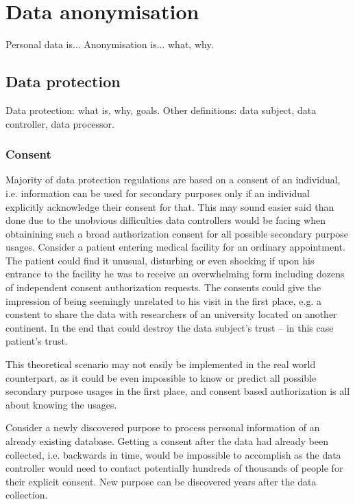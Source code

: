 \documentclass[a4paper,twoside,12pt]{book}
\begin{document}
\chapter{Data anonymisation}

\color{blue}
Personal data is...
Anonymisation is... what, why.
\color{black}

\section{Data protection}

\color{blue}
Data protection: what is, why, goals.
Other definitions: data subject, data controller, data processor.
\color{black}

\subsection{Consent}
Majority of data protection regulations are based on a consent of an individual, i.e. information can be used for secondary purposes only if an individual explicitly acknowledge their consent for that. This may sound easier said than done due to the unobvious difficulties data controllers would be facing when obtainining such a broad authorization consent for all possible secondary purpose usages. Consider a patient entering medical facility for an ordinary appointment. The patient could find it unusual, disturbing or even shocking if upon his entrance to the facility he was to receive an overwhelming form including dozens of independent consent authorization requests. The consents could give the impression of being seemingly unrelated to his visit in the first place, e.g. a constent to share the data with researchers of an university located on another continent. In the end that could destroy the data subject's trust – in this case patient's trust.

This theoretical scenario may not easily be implemented in the real world counterpart, as it could be even impossible to know or predict all possible secondary purpose usages in the first place, and consent based authorization is all about knowing the usages.

Consider a newly discovered purpose to process personal information of an already existing database. Getting a consent after the data had already been collected, i.e. backwards in time, would be impossible to accomplish as the data controller would need to contact potentially hundreds of thousands of people for their explicit consent. New purpose can be discovered years after the data collection.
\end{document}
